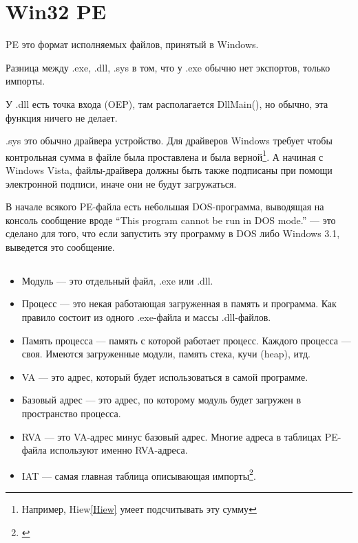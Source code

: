 \section{Win32 PE}

\acs{PE} это формат исполняемых файлов, принятый в Windows.

Разница между .exe, .dll, .sys в том, что у .exe обычно нет экспортов, только импорты.

У .dll есть точка входа (\ac{OEP}), там располагается DllMain(), но обычно, эта
функция ничего не делает.

.sys это обычно драйвера устройство. Для драйверов Windows требует чтобы контрольная сумма в файле была проставлена
и была верной\footnote{Например, Hiew\ref{Hiew} умеет подсчитывать эту сумму}.
А начиная с Windows Vista, файлы-драйвера должны быть также подписаны при помощи электронной подписи, 
иначе они не будут загружаться.

В начале всякого PE-файла есть небольшая DOS-программа, выводящая на консоль сообщение вроде ``This program cannot be run in DOS mode.'' --- 
это сделано для того, что если запустить эту программу в DOS либо Windows 3.1, выведется это сообщение.

\subsection{}

\begin{itemize}
\item
Модуль --- это отдельный файл, .exe или .dll.

\item
Процесс --- это некая работающая загруженная в память и программа. Как правило состоит из одного .exe-файла и массы
.dll-файлов.

\item
Память процесса --- память с которой работает процесс. Каждого процесса --- своя. Имеются загруженные модули, память
стека, кучи (heap), итд.

\item
\ac{VA} --- это адрес, который будет использоваться в самой программе.

\item
Базовый адрес --- это адрес, по которому модуль будет загружен в пространство процесса.

\item
\ac{RVA} --- это \ac{VA}-адрес минус базовый адрес. Многие адреса в таблицах PE-файла используют именно \ac{RVA}-адреса.

\item
\ac{IAT} --- самая главная таблица описывающая импорты\footnote{\cite{Pietrek1}}.
\end{itemize}

